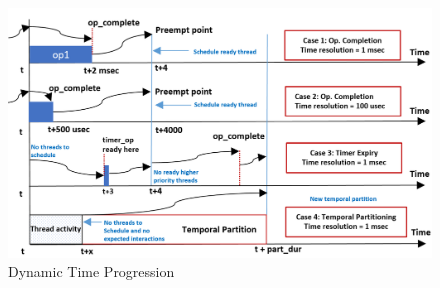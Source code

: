 \begin{figure}[h]
	\centering
	\includegraphics[width=\textwidth]{./img/time}
	\caption{Dynamic Time Progression}
	\label{fig:time}
\end{figure}

